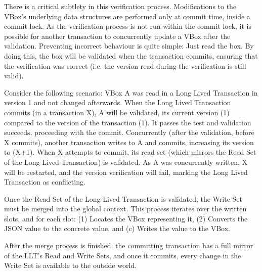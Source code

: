 There is a critical subtlety in this verification
process. Modifications to the VBox's underlying data structures are
performed only at commit time, inside a commit lock. As the
verification process is not run within the commit lock, it is possible
for another transaction to concurrently update a VBox after the
validation. Preventing incorrect behaviour is quite simple: Just read
the box. By doing this, the box will be validated when the transaction
commits, ensuring that the verification was correct (i.e. the version
read during the verification is still valid).

Consider the following scenario: VBox A was read in a Long Lived
Transaction in version 1 and not changed afterwards. When the Long
Lived Transaction commits (in a transaction X), A will be validated,
its current version (1) compared to the version of the transaction
(1). It passes the test and validation succeeds, proceeding with the
commit. Concurrently (after the validation, before X commits), another
transaction writes to A and commits, increasing its version to (X+1). When
X attempts to commit, its read set (which mirrors the Read Set of the
Long Lived Transaction) is validated. As A was concurrently written, X
will be restarted, and the version verification will fail, marking the
Long Lived Transaction as conflicting.

Once the Read Set of the Long Lived Transaction is validated, the
Write Set must be merged into the global context. This process
iterates over the written slots, and for each slot: (1) Locates the
VBox representing it, (2) Converts the JSON value to the concrete value,
and (c) Writes the value to the VBox.

After the merge process is finished, the committing transaction has a
full mirror of the LLT's Read and Write Sets, and once it commits,
every change in the Write Set is available to the outside world.

